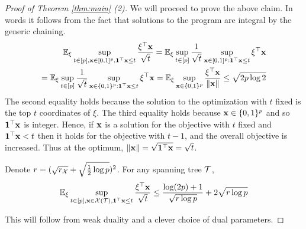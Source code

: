 \begin{proof}[Proof of Theorem \ref{thm:main} (2)]
We will proceed to prove the above claim.  In words it follows from the fact that solutions to the program are integral by the generic chaining.
\[
\begin{aligned}
\mathbb{E}_\xi \sup_{t \in [p],\mathbf{x} \in [0,1]^p, {\bf 1}^\top \mathbf{x} \le t} \frac{\xi^\top \mathbf{x}}{\sqrt{t}} = \mathbb{E}_\xi \sup_{t \in [p]} \frac 1{\sqrt{t}} \sup_{\mathbf{x} \in [0,1]^p: {\bf 1}^\top \mathbf{x} \le t} \xi^\top \mathbf{x} \\
= \mathbb{E}_\xi \sup_{t \in [p]} \frac 1{\sqrt{t}} \sup_{\mathbf{x} \in \{0,1\}^p: {\bf 1}^\top \mathbf{x} \le t} \xi^\top \mathbf{x} = \mathbb{E}_\xi \sup_{\mathbf{x} \in \{0,1\}^p} \frac{\xi^\top \mathbf{x}}{\| \mathbf{x}\|} \le \sqrt{2 p \log 2}\\
\end{aligned}
\]
The second equality holds because the solution to the optimization with $t$ fixed is the top $t$ coordinates of $\xi$.
The third equality holds because $\mathbf{x} \in \{0,1\}^p$ and so ${\bf 1}^\top \mathbf{x}$ is integer.  Hence, if $\mathbf{x}$ is a solution for the objective with $t$ fixed and ${\bf 1}^\top \mathbf{x} < t$ then it holds for the objective with $t-1$, and the overall objective is increased.
Thus at the optimum, $\| \mathbf{x} \| = \sqrt{{\bf 1}^\top \mathbf{x}} = \sqrt{t}$.

\begin{claim}
Denote $r = (\sqrt{r_{\mathcal{X}}} + \sqrt{\frac 12 \log p} )^2$.
For any spanning tree ${\mathcal{T}}$,
\[
\mathbb{E}_\xi \sup_{t \in [p], \mathbf{x} \in \mathcal{X}({\mathcal{T}}), {\bf 1}^\top \mathbf{x} \le t}  \frac{\xi^\top \mathbf{x}}{\sqrt{t}} \le \frac{\log (2p)+1}{\sqrt{r \log p} } + 2 \sqrt{r \log p}
\]
\end{claim}

This will follow from weak duality and a clever choice of dual parameters.


\end{proof}
